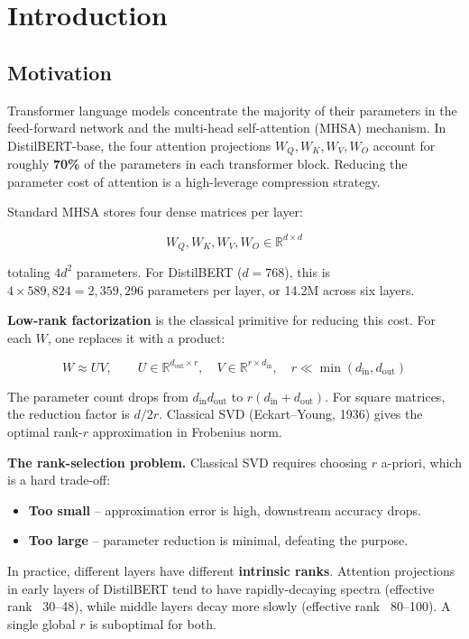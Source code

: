 
\section{Introduction}

\subsection{Motivation}

Transformer language models concentrate the majority of their parameters in 
the feed-forward network and the multi-head self-attention (MHSA) mechanism. 
In DistilBERT-base, the four attention projections $W_Q, W_K, W_V, W_O$ 
account for roughly \textbf{70\%} of the parameters in each transformer block. 
Reducing the parameter cost of attention is a high-leverage compression 
strategy.

Standard MHSA stores four dense matrices per layer:

\[
W_Q, W_K, W_V, W_O \in \mathbb{R}^{d \times d}
\tag{1.1}
\]

totaling $4 d^2$ parameters. For DistilBERT ($d = 768$), this is 
$4 \times 589{,}824 = 2{,}359{,}296$ parameters per layer, or 14.2M across 
six layers.

\textbf{Low-rank factorization} is the classical primitive for reducing this cost. 
For each $W$, one replaces it with a product:

\[
W \approx U V, \qquad
U \in \mathbb{R}^{d_\text{out} \times r}, \quad
V \in \mathbb{R}^{r \times d_\text{in}}, \quad r \ll \min(d_\text{in}, d_\text{out})
\tag{1.2}
\]

The parameter count drops from $d_\text{in} d_\text{out}$ to 
$r(d_\text{in} + d_\text{out})$. For square matrices, the reduction factor is 
$d / 2r$. Classical SVD (Eckart--Young, 1936) gives the optimal rank-$r$ 
approximation in Frobenius norm.

\textbf{The rank-selection problem.} Classical SVD requires choosing $r$ 
a-priori, which is a hard trade-off:

\begin{itemize}
\item \textbf{Too small} -- approximation error is high, downstream accuracy drops.
\item \textbf{Too large} -- parameter reduction is minimal, defeating the purpose.

\end{itemize}
In practice, different layers have different \textbf{intrinsic ranks}. Attention 
projections in early layers of DistilBERT tend to have rapidly-decaying 
spectra (effective rank ~30--48), while middle layers decay more slowly 
(effective rank ~80--100). A single global $r$ is suboptimal for both.

